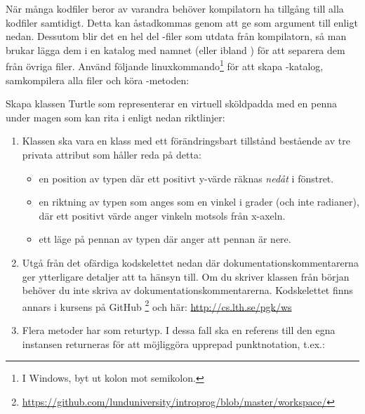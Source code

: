 \noindent När många kodfiler beror av varandra behöver kompilatorn ha tillgång till alla kodfiler samtidigt.  Detta kan åstadkommas genom att ge  som argument till  enligt nedan. Dessutom blir det en hel del -filer som utdata från kompilatorn, så man brukar lägga dem i en katalog med namnet  (eller ibland ) för att separera dem från övriga filer. Använd följande linuxkommando\footnote{I Windows, byt ut kolon mot semikolon.} för att skapa -katalog, samkompilera alla filer och köra -metoden:


\Task Skapa klassen Turtle som representerar en virtuell sköldpadda med en penna under magen som kan rita i  enligt nedan riktlinjer:

\begin{enumerate}
\item Klassen  ska vara en klass med ett förändringsbart tillstånd bestående av tre privata attribut som håller reda på detta:

\begin{itemize}
\item en position av typen  där ett positivt y-värde räknas \emph{nedåt} i fönstret.
\item en riktning av typen  som anges som en vinkel i grader  (och inte radianer), där ett positivt värde anger vinkeln motsols från x-axeln. 
\item ett läge på pennan av typen  där  anger att pennan är nere.
\end{itemize}

\item Utgå från det ofärdiga kodskelettet nedan där dokumentationskommentarerna ger ytterligare detaljer att ta hänsyn till. Om du skriver klassen från början behöver du inte skriva av dokumentationskommentarerna. Kodskelettet finns annars i kursens  på GitHub%
\footnote{\url{https://github.com/lunduniversity/introprog/blob/master/workspace/}} och här: \url{http://cs.lth.se/pgk/ws}

\item Flera metoder har  som returtyp. I dessa fall ska en referens till den egna instansen returneras för att möjliggöra upprepad punktnotation, t.ex.:\\

\end{enumerate}

